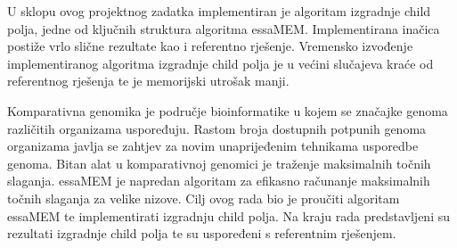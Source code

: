 \documentclass[times, utf8, seminar, numeric]{fer}
\begin{document}
U sklopu ovog projektnog zadatka implementiran je algoritam izgradnje child polja, jedne od ključnih struktura algoritma essaMEM. Implementirana inačica postiže vrlo slične rezultate kao i referentno rješenje. Vremensko izvođenje implementiranog algoritma izgradnje child polja je u većini slučajeva kraće od referentnog rješenja te je memorijski utrošak manji.




\begin{sazetak}
  Komparativna genomika je područje bioinformatike u kojem se značajke genoma različitih organizama uspoređuju. Rastom broja dostupnih potpunih genoma organizama javlja se zahtjev za novim unaprijeđenim tehnikama usporedbe genoma. Bitan alat u komparativnoj genomici je traženje maksimalnih točnih slaganja. essaMEM je napredan algoritam za efikasno računanje maksimalnih točnih slaganja za velike nizove. Cilj ovog rada bio je proučiti algoritam essaMEM te implementirati izgradnju child polja. Na kraju rada predstavljeni su rezultati izgradnje child polja te su uspoređeni s referentnim rješenjem.

\end{sazetak}
\end{document}
